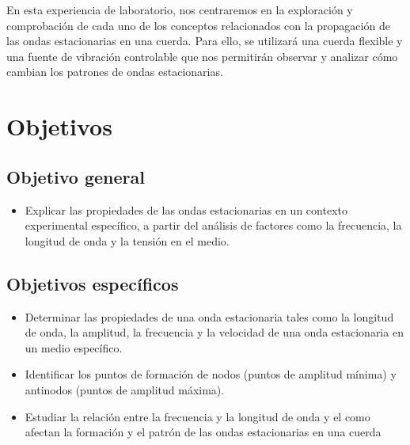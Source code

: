 \documentclass[twocolumn, 12pt]{article}
\begin{document}
En esta experiencia de laboratorio, nos centraremos en la
exploración y comprobación de cada uno de los conceptos
relacionados con la propagación de las ondas estacionarias
en una cuerda. Para ello, se utilizará una cuerda flexible
y una fuente de vibración controlable que nos permitirán
observar y analizar cómo cambian los patrones de ondas
estacionarias.

\section{Objetivos}

\subsection{Objetivo general}

\begin{itemize}[label=$\triangleright$]
    \item Explicar las propiedades de las ondas estacionarias en un
          contexto experimental específico, a partir del análisis de
          factores como la frecuencia, la longitud de onda y la
          tensión en el medio.
\end{itemize}

\subsection{Objetivos específicos}

\begin{itemize}[label=$\triangleright$]
    \item Determinar las propiedades de una onda estacionaria tales
          como la longitud de onda, la amplitud, la frecuencia y la
          velocidad de una onda estacionaria en un medio específico.

    \item Identificar los puntos de formación de nodos (puntos de
          amplitud mínima) y antinodos (puntos de amplitud máxima).

    \item Estudiar la relación entre la frecuencia y la longitud de
          onda y el como afectan la formación y el patrón de las
          ondas estacionarias en una cuerda
\end{itemize}

\end{document}
